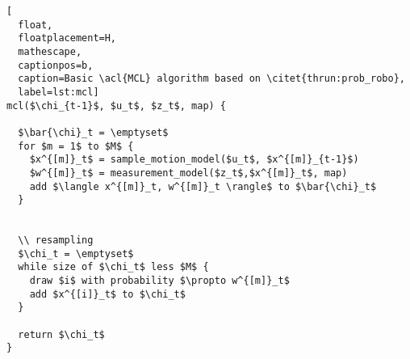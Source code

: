 \begin{lstlisting}[
  float,
  floatplacement=H,
  mathescape,
  captionpos=b,
  caption=Basic \acl{MCL} algorithm based on \citet{thrun:prob_robo},
  label=lst:mcl]
mcl($\chi_{t-1}$, $u_t$, $z_t$, map) {

  $\bar{\chi}_t = \emptyset$
  for $m = 1$ to $M$ {
    $x^{[m]}_t$ = sample_motion_model($u_t$, $x^{[m]}_{t-1}$)
    $w^{[m]}_t$ = measurement_model($z_t$,$x^{[m]}_t$, map)
    add $\langle x^{[m]}_t, w^{[m]}_t \rangle$ to $\bar{\chi}_t$
  }


  \\ resampling
  $\chi_t = \emptyset$
  while size of $\chi_t$ less $M$ {
    draw $i$ with probability $\propto w^{[m]}_t$
    add $x^{[i]}_t$ to $\chi_t$
  }

  return $\chi_t$
}
\end{lstlisting}
